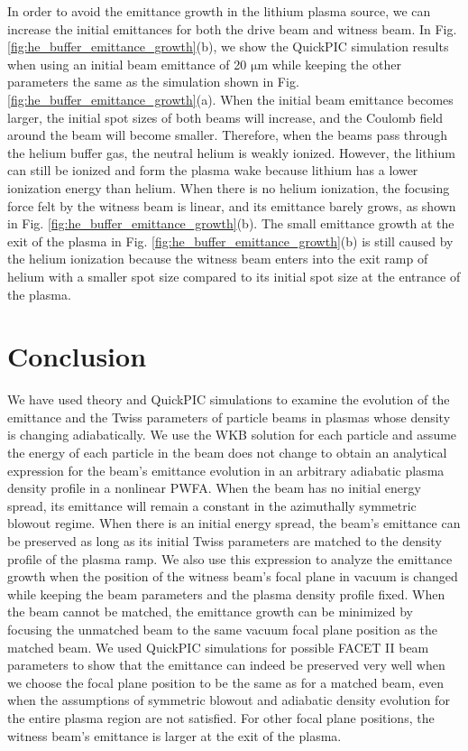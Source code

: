 \documentclass[%
reprint, superscriptaddress,
 amsmath,amssymb, aps,
prstab,
]{revtex4-2}
\begin{document}
In order to avoid the emittance growth in the lithium plasma source, we
can increase the initial emittances for both the drive beam and witness beam.
In Fig. \ref{fig:he_buffer_emittance_growth}(b), we show the QuickPIC
simulation results when using an initial beam emittance of 20 $\mathrm{\mu m}$
 while keeping the other parameters the same as the
simulation shown in Fig. \ref{fig:he_buffer_emittance_growth}(a). When
the initial beam emittance becomes larger, the initial spot sizes of
both beams will increase, and the Coulomb field around the beam will
become smaller. Therefore, when the beams pass through the helium buffer gas,
the neutral helium is weakly ionized. However, the lithium can still
be ionized and form the plasma wake because lithium has a lower
ionization energy than helium. When there is no helium ionization, the
focusing force felt by the witness beam is linear, and its
emittance barely grows, as shown in
Fig. \ref{fig:he_buffer_emittance_growth}(b). The small emittance growth at the exit of the plasma in
Fig. \ref{fig:he_buffer_emittance_growth}(b) is still caused by the
helium ionization because the witness beam enters into the exit ramp of
helium with a smaller spot size compared to its initial spot size
at the entrance of the plasma.

\section{Conclusion} We have used theory and QuickPIC simulations to examine the evolution of the emittance and the Twiss parameters of particle beams in plasmas whose density is changing adiabatically. We use the WKB solution for each particle and assume the energy of each particle in the beam does not change
to obtain an analytical expression for the beam's emittance evolution in an
arbitrary adiabatic plasma density profile in a nonlinear PWFA. When the
beam has no initial energy spread, its emittance will remain a constant in the azimuthally symmetric  blowout regime.
When there is an initial energy spread, the beam's emittance can be
preserved as long as its initial Twiss parameters are matched to the density profile of the plasma
ramp. We also use this expression to analyze the emittance
growth when the position of the witness beam's focal plane in vacuum is changed while keeping the beam
parameters and the plasma density profile fixed. When the beam
cannot be matched, the emittance growth can be minimized by focusing the
unmatched beam to the same vacuum focal plane position as the matched
beam. We used QuickPIC simulations for 
possible FACET II beam parameters to show that the emittance can indeed be
preserved very well when we choose the focal plane position to be the same as
for a matched beam, even when the assumptions of symmetric blowout and adiabatic density evolution for the entire plasma region are not satisfied. 
For other focal
plane positions, the witness beam's emittance is larger at the exit
of the plasma. 
\end{document}
